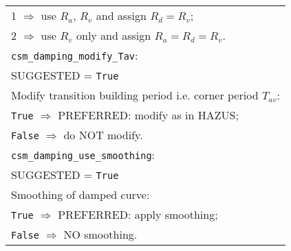 \documentclass[a4paper, 12pt]{report}
\begin{document}
\begin{tabular}{|p{\textwidth}|}
 \hspace{0.5em} 1 $\Rightarrow$ use $R_a$, $R_v$ and assign $R_d= R_v$; \\
 \hspace{0.5em} 2 $\Rightarrow$ use $R_v$ only and assign $R_a=R_d=R_v$. \\
\hline \vspace{0.1em} \texttt{csm\_damping\_modify\_Tav}: \\
SUGGESTED = \texttt{True} \\
Modify transition building period i.e. corner period $T_{av}$: \\
 \hspace{0.5em} \texttt{True} $\Rightarrow$ \small{PREFERRED}: modify as in HAZUS; \\
 \hspace{0.5em}  \texttt{False} $\Rightarrow$ do NOT modify. \\
\hline \vspace{0.1em} \texttt{csm\_damping\_use\_smoothing}: \\
SUGGESTED = \texttt{True} \\
Smoothing of damped curve: \\
 \hspace{0.5em} \texttt{True} $\Rightarrow$ \small{PREFERRED}: apply smoothing; \\
 \hspace{0.5em} \texttt{False} $\Rightarrow$ NO smoothing.\\
\hline
\end{tabular}
\end{document}
